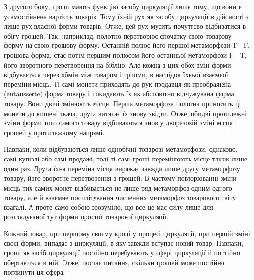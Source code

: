 З другого боку, гроші мають функцію засобу циркуляції
лише тому, що вони є усамостійнена вартість товарів. Тому їхній
рух як засобу циркуляції в дійсності є лише рух власної форми
товарів. Отже, цей рух мусить почуттєво відбиватися в обігу
грошей. Так, наприклад, полотно перетворює спочатку свою
товарову форму на свою грошову форму. Останній полюс його
першої метаморфози $Т — Г$, грошова форма, стає потім першим
полюсом його останньої метаморфози $Г — Т$, його зворотного
перетворення на біблію. Але кожна з цих обох змін форми відбувається
через обмін між товаром і грішми, в наслідок їхньої
взаємної переміни місць. Ті самі монети приходять до рук продавця
як преобраяїена (entäusserte) форма товару і покидають їх
як абсолютно відчужувана форма товару. Вони двічі змінюють
місце. Перша метаморфоза полотна приносить ці монети до кишені
ткача, друга витягає їх знову звідти. Отже, обидві протилежні
зміни форми того самого товару відбиваються знов у дворазовій
зміні місця грошей у протилежному напрямі.

Навпаки, коли відбуваються лише однобічні товарові метаморфози,
однаково, самі купівлі або самі продажі, тоді ті самі
гроші перемінюють місце також лише один раз. Друга їхня
переміна місця виражає завжди лише другу метаморфозу товару,
його зворотне перетворення з грошей. В частому повторюванні
зміни місць тих самих монет відбивається не лише ряд метаморфоз
одним-одного товару, але й взаємне посплітування численних
метаморфоз товарового світу взагалі. А проте само собою зрозуміло,
що все це має силу лише для розглядуваної тут форми
простої товарової циркуляції.

Кожний товар, при першому своєму кроці у процесі циркуляції,
при першій зміні своєї форми, випадає з циркуляції, в яку завжди
вступає новий товар. Навпаки, гроші як засіб циркуляції постійно
перебувають у сфері циркуляції й постійно обертаються
в ній. Отже, постає питання, скільки грошей може постійно поглинути
ця сфера.

